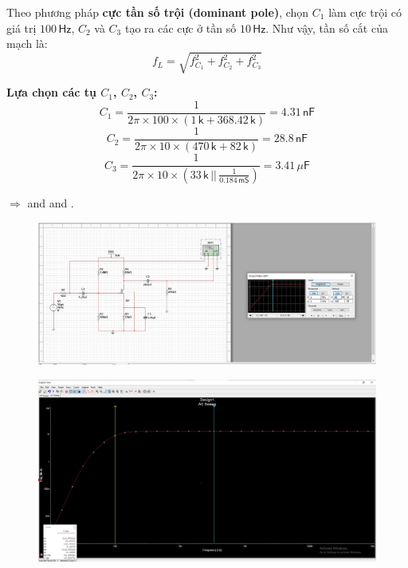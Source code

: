 Theo phương pháp \textbf{cực tần số trội (dominant pole)}, chọn $C_{1}$ làm cực trội có giá trị $100\,\textsf{Hz}$, 
$C_{2}$ và $C_{3}$ tạo ra các cực ở tần số $10\,\textsf{Hz}$.  
Như vậy, tần số cắt của mạch là:
\[
f_{L}=\sqrt{f_{C_{1}}^{2}+f_{C_{2}}^{2}+f_{C_{3}}^{2}}
\]

\textbf{Lựa chọn các tụ $C_{1}$, $C_{2}$, $C_{3}$:}
\[
C_{1}=\frac{1}{2\pi\times100\times\left(1\,\textsf{k}+368.42\,\textsf{k}\right)}=4.31\,\textsf{nF}
\]
\[
C_{2}=\frac{1}{2\pi\times10\times(470\,\textsf{k}+82\,\textsf{k})}=28.8\,\textsf{nF}
\]
\[
C_{3}=\frac{1}{2\pi\times10\times\left(33\,\textsf{k}\,||\,\frac{1}{0.184\,\textsf{mS}}\right)}=3.41\,\mu\textsf{F}
\]

$\Rightarrow$  and  and .

\begin{figure}[H]
	\centering
	\includegraphics[width=\linewidth]{./my-chapters/my-images/Question1/Câu 1 Hình 1 d.jpg}
\end{figure}

\begin{figure}[H]
	\centering
	\includegraphics[width=\linewidth]{./my-chapters/my-images/Question1/Câu 1 Hình 1 d - AC sweep.jpg}
\end{figure}

